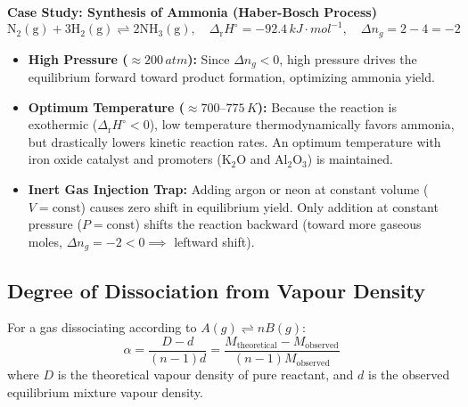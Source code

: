 \documentclass[10pt,a4paper]{article}
\begin{document}
\begin{ncertbox}
\textbf{Case Study: Synthesis of Ammonia (Haber-Bosch Process)}
\begin{equation*}
  \mathrm{N_2(g) + 3H_2(g) \rightleftharpoons 2NH_3(g)}, \quad \Delta_{\mathrm{r}}H^\circ = -92.4\,\si{kJ\cdot mol^{-1}}, \quad \Delta n_g = 2 - 4 = -2
\end{equation*}
\begin{itemize}
  \item \textbf{High Pressure ($\approx 200\,\si{atm}$):} Since $\Delta n_g < 0$, high pressure drives the equilibrium forward toward product formation, optimizing ammonia yield.
  \item \textbf{Optimum Temperature ($\approx 700\text{--}775\,\si{K}$):} Because the reaction is exothermic ($\Delta_{\mathrm{r}}H^\circ < 0$), low temperature thermodynamically favors ammonia, but drastically lowers kinetic reaction rates. An optimum temperature with iron oxide catalyst and promoters ($\mathrm{K_2O}$ and $\mathrm{Al_2O_3}$) is maintained.
  \item \textbf{Inert Gas Injection Trap:} Adding argon or neon at constant volume ($V = \text{const}$) causes zero shift in equilibrium yield. Only addition at constant pressure ($P = \text{const}$) shifts the reaction backward (toward more gaseous moles, $\Delta n_g = -2 < 0 \implies$ leftward shift).
\end{itemize}
\end{ncertbox}

\subsection{Degree of Dissociation from Vapour Density}
For a gas dissociating according to $A(g) \rightleftharpoons n B(g)$:
\begin{equation}
  \alpha = \frac{D - d}{(n - 1)d} = \frac{M_{\text{theoretical}} - M_{\text{observed}}}{(n - 1)M_{\text{observed}}}
\end{equation}
where $D$ is the theoretical vapour density of pure reactant, and $d$ is the observed equilibrium mixture vapour density.
\end{document}
